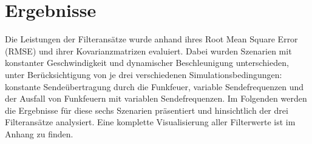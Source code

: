 \documentclass[conference]{IEEEtran}[10pt]
\begin{document}






\section{Ergebnisse}

Die Leistungen der Filteransätze wurde anhand ihres Root Mean Square Error (RMSE) und ihrer Kovarianzmatrizen evaluiert. Dabei wurden Szenarien mit konstanter Geschwindigkeit und dynamischer Beschleunigung unterschieden, unter Berücksichtigung von je drei verschiedenen Simulationsbedingungen: konstante Sendeübertragung durch die Funkfeuer, variable Sendefrequenzen und der Ausfall von Funkfeuern mit variablen Sendefrequenzen. Im Folgenden werden die Ergebnisse für diese sechs Szenarien präsentiert und hinsichtlich der drei Filteransätze analysiert. Eine komplette Visualisierung aller Filterwerte ist im Anhang zu finden.
\end{document}
